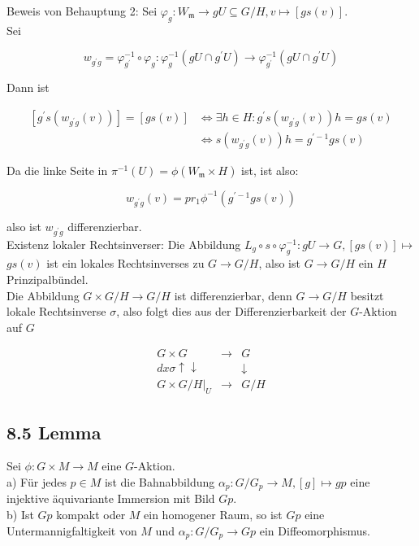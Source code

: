\documentclass[10pt, letterpaper]{article}
\begin{document}
Beweis von Behauptung 2: Sei $\varphi_{g}: W_{\mathfrak{m}} \rightarrow g U \subseteq G / H, v \mapsto[g s(v)]$.\\
Sei

$$
w_{g^{\prime} g}=\varphi_{g^{\prime}}^{-1} \circ \varphi_{g}: \varphi_{g}^{-1}\left(g U \cap g^{\prime} U\right) \rightarrow \varphi_{g^{\prime}}^{-1}\left(g U \cap g^{\prime} U\right)
$$

Dann ist

$$
\begin{aligned}
{\left[g^{\prime} s\left(w_{g^{\prime} g}(v)\right)\right]=[g s(v)] } & \Leftrightarrow \exists h \in H: g^{\prime} s\left(w_{g^{\prime} g}(v)\right) h=g s(v) \\
& \Leftrightarrow s\left(w_{g^{\prime} g}(v)\right) h=g^{\prime-1} g s(v)
\end{aligned}
$$

Da die linke Seite in $\pi^{-1}(U)=\phi\left(W_{\mathfrak{m}} \times H\right)$ ist, ist also:

$$
w_{g^{\prime} g}(v)=p r_{1} \phi^{-1}\left(g^{\prime-1} g s(v)\right)
$$

also ist $w_{g^{\prime} g}$ differenzierbar.\\
Existenz lokaler Rechtsinverser: Die Abbildung $L_{g} \circ s \circ \varphi_{g}^{-1}: g U \rightarrow G,[g s(v)] \mapsto$ $g s(v)$ ist ein lokales Rechtsinverses zu $G \rightarrow G / H$, also ist $G \rightarrow G / H$ ein $H$ Prinzipalbündel.\\
Die Abbildung $G \times G / H \rightarrow G / H$ ist differenzierbar, denn $G \rightarrow G / H$ besitzt lokale Rechtsinverse $\sigma$, also folgt dies aus der Differenzierbarkeit der $G$-Aktion auf $G$

$$
\begin{array}{ccc}
G \times G & \longrightarrow & G \\
d x \sigma \uparrow \downarrow & & \downarrow \\
G \times G /\left.H\right|_{U} & \longrightarrow & G / H
\end{array}
$$

\subsection*{8.5 Lemma}
Sei $\phi: G \times M \rightarrow M$ eine $G$-Aktion.\\
a) Für jedes $p \in M$ ist die Bahnabbildung $\alpha_{p}: G / G_{p} \rightarrow M,[g] \mapsto g p$ eine injektive äquivariante Immersion mit Bild $G p$.\\
b) Ist $G p$ kompakt oder $M$ ein homogener Raum, so ist $G p$ eine Untermannigfaltigkeit von $M$ und $\alpha_{p}: G / G_{p} \rightarrow G p$ ein Diffeomorphismus.
\end{document}
